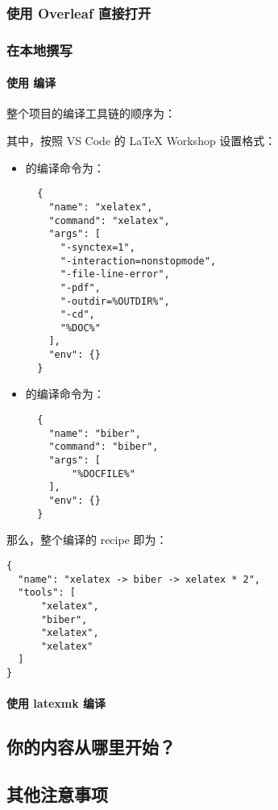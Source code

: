 \subsubsection{使用 Overleaf 直接打开}

\subsubsection{在本地撰写}
\paragraph{使用 {} 编译}
整个项目的编译工具链的顺序为：
\begin{center}
\end{center}


其中，按照 VS Code 的 LaTeX Workshop 设置格式：

\begin{itemize}
  \item {} 的编译命令为：
  \begin{verbatim}
  {
    "name": "xelatex",
    "command": "xelatex",
    "args": [
      "-synctex=1",
      "-interaction=nonstopmode",
      "-file-line-error",
      "-pdf",
      "-outdir=%OUTDIR%",
      "-cd",
      "%DOC%"
    ],
    "env": {}
  }
  \end{verbatim}
  \item {} 的编译命令为：
  \begin{verbatim}
  {
    "name": "biber",
    "command": "biber",
    "args": [
        "%DOCFILE%"
    ],
    "env": {}
  }
  \end{verbatim}
\end{itemize}

那么，整个编译的 recipe 即为：

\begin{verbatim}
{
  "name": "xelatex -> biber -> xelatex * 2",
  "tools": [
      "xelatex",
      "biber",
      "xelatex",
      "xelatex"
  ]
}
\end{verbatim}

\paragraph{使用 latexmk 编译}

\subsection{你的内容从哪里开始？}

\subsection{其他注意事项}
